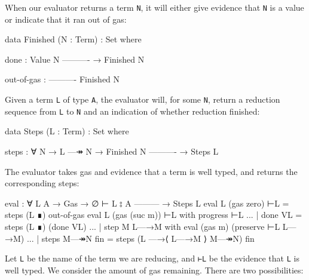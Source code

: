 When our evaluator returns a term \texttt{N}, it will either give
evidence that \texttt{N} is a value or indicate that it ran out of gas:

\begin{fence}
\begin{code}
data Finished (N : Term) : Set where

  done :
      Value N
      ----------
    → Finished N

  out-of-gas :
      ----------
      Finished N
\end{code}
\end{fence}

Given a term \texttt{L} of type \texttt{A}, the evaluator will, for some
\texttt{N}, return a reduction sequence from \texttt{L} to \texttt{N}
and an indication of whether reduction finished:

\begin{fence}
\begin{code}
data Steps (L : Term) : Set where

  steps : ∀ {N}
    → L —↠ N
    → Finished N
      ----------
    → Steps L
\end{code}
\end{fence}

The evaluator takes gas and evidence that a term is well typed, and
returns the corresponding steps:

\begin{fence}
\begin{code}
eval : ∀ {L A}
  → Gas
  → ∅ ⊢ L ⦂ A
    ---------
  → Steps L
eval {L} (gas zero)    ⊢L                                =  steps (L ∎) out-of-gas
eval {L} (gas (suc m)) ⊢L with progress ⊢L
... | done VL                                            =  steps (L ∎) (done VL)
... | step {M} L—→M with eval (gas m) (preserve ⊢L L—→M)
...    | steps M—↠N fin                                  =  steps (L —→⟨ L—→M ⟩ M—↠N) fin
\end{code}
\end{fence}

Let \texttt{L} be the name of the term we are reducing, and \texttt{⊢L}
be the evidence that \texttt{L} is well typed. We consider the amount of
gas remaining. There are two possibilities:

